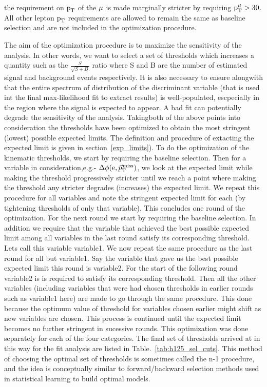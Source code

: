 the requirement on $\text{p}_\text{T}$ of the $\mu$ is made marginally stricter by requiring  $\text{p}_\text{T}^{\mu} > 30$\GeV. All other lepton $\text{p}_\text{T}$ requirements are allowed to remain the same as baseline selection and are not included in the optimization procedure.   

The aim of the optimization procedure is to maximize the sensitivity of the analysis. In other words, we want to select a set of thresholds which increases a quantity such as the $\frac{S}{\sqrt{S+B}}$ ratio where S and B are the number of estimated signal and background events respectively. It is also necessary to ensure alongwith that the entire spectrum of distribution of the discriminant variable (that is used int the final max-likelihood fit to extract results) is well-populated, escpecially in the region where the signal is expected to appear. A bad fit can potentially degrade the sensitivity of the analysis. Takingboth of the above points into consideration the thresholds have been optimized to obtain the most stringent (lowest) possible expected limits. The definition and procedure of extacting the expected limit is given in section~\ref{exp_limits}). To do the optimization of the kinematic thresholds, we start by requiring the baseline selection. Then for a variable in consideration,e.g.- $\Delta\phi(\text{e}, {\vec p}_{\mathrm{T}}^{\kern1pt\text{miss}})$, we look at the expected limit while making the threshold progressively stricter until we reach a point where making the threshold any stricter degrades (increases) the expected limit. We repeat this procedure for all variables and note the stringent expected limit for each (by tightening thresholds of only that variable). This concludes one round of the optimization. For the next round we start by requiring the baseline selection. In addition we require that the variable that achieved the best possible expected limit among all variables in the last round satisfy its corresponding threshold. Lets call this variable variable1. We now repeat the same procedure as the last round for all but variable1. Say the variable that gave us the best possible expected limit this round is variable2. For the start of the following round variable2 is is required to satisfy its corresponding threshold. Then all the other variables (including variables that were had chosen thresholds in earlier rounds such as variable1 here) are made to go through the same procedure. This done because the optimum value of threshold for variables chosen earlier might shift as new variables are chosen. This process is continued until the expected limit becomes no further stringent in sucessive rounds. This optimization was done separately for each of the four categories. The final set of thresholds arrived at in this way for the \hmue \mcol fit analysis are listed in Table.~\ref{tab:h125_sel_cuts}. This method of choosing the optimal set of thresholds is sometimes called the n-1 procedure, and the idea is conceptually similar to forward/backward selection methods used in statistical learning to build optimal models.             


